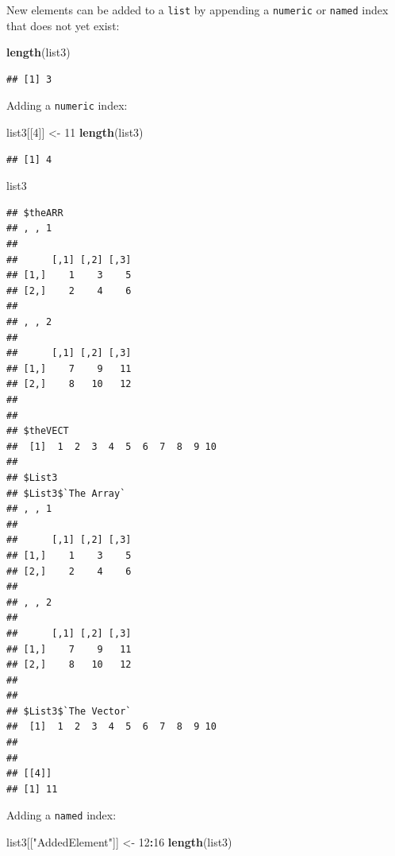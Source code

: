 \documentclass[]{book}
\newenvironment{Shaded}{\begin{snugshade}}{\end{snugshade}}
\newcommand{\DecValTok}[1]{\textcolor[rgb]{0.00,0.00,0.81}{#1}}
\newcommand{\KeywordTok}[1]{\textcolor[rgb]{0.13,0.29,0.53}{\textbf{#1}}}
\newcommand{\NormalTok}[1]{#1}
\newcommand{\OperatorTok}[1]{\textcolor[rgb]{0.81,0.36,0.00}{\textbf{#1}}}
\newcommand{\StringTok}[1]{\textcolor[rgb]{0.31,0.60,0.02}{#1}}
\theoremstyle{definition}
\theoremstyle{definition}
\theoremstyle{definition}
\theoremstyle{remark}
\begin{document}
New elements can be added to a \texttt{list} by appending a
\texttt{numeric} or \texttt{named} index that does not yet exist:

\begin{Shaded}
\begin{Highlighting}[]
\KeywordTok{length}\NormalTok{(list3)}
\end{Highlighting}
\end{Shaded}

\begin{verbatim}
## [1] 3
\end{verbatim}

Adding a \texttt{numeric} index:

\begin{Shaded}
\begin{Highlighting}[]
\NormalTok{list3[[}\DecValTok{4}\NormalTok{]] <-}\StringTok{ }\DecValTok{11}
\KeywordTok{length}\NormalTok{(list3)}
\end{Highlighting}
\end{Shaded}

\begin{verbatim}
## [1] 4
\end{verbatim}

\begin{Shaded}
\begin{Highlighting}[]
\NormalTok{list3}
\end{Highlighting}
\end{Shaded}

\begin{verbatim}
## $theARR
## , , 1
## 
##      [,1] [,2] [,3]
## [1,]    1    3    5
## [2,]    2    4    6
## 
## , , 2
## 
##      [,1] [,2] [,3]
## [1,]    7    9   11
## [2,]    8   10   12
## 
## 
## $theVECT
##  [1]  1  2  3  4  5  6  7  8  9 10
## 
## $List3
## $List3$`The Array`
## , , 1
## 
##      [,1] [,2] [,3]
## [1,]    1    3    5
## [2,]    2    4    6
## 
## , , 2
## 
##      [,1] [,2] [,3]
## [1,]    7    9   11
## [2,]    8   10   12
## 
## 
## $List3$`The Vector`
##  [1]  1  2  3  4  5  6  7  8  9 10
## 
## 
## [[4]]
## [1] 11
\end{verbatim}

Adding a \texttt{named} index:

\begin{Shaded}
\begin{Highlighting}[]
\NormalTok{list3[[}\StringTok{"AddedElement"}\NormalTok{]] <-}\StringTok{ }\DecValTok{12}\OperatorTok{:}\DecValTok{16}
\KeywordTok{length}\NormalTok{(list3)}
\end{Highlighting}
\end{Shaded}
\end{document}
